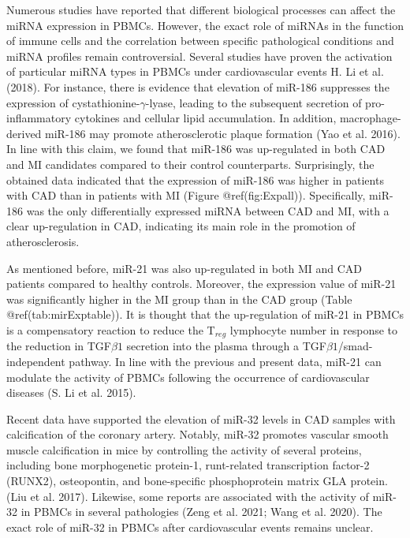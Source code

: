 \documentclass[smallextended]{svjour3}       %
\begin{document}
Numerous studies have reported that different biological processes can
affect the miRNA expression in PBMCs. However, the exact role of miRNAs
in the function of immune cells and the correlation between specific
pathological conditions and miRNA profiles remain controversial. Several
studies have proven the activation of particular miRNA types in PBMCs
under cardiovascular events H. Li et al. (2018). For instance, there is
evidence that elevation of miR-186 suppresses the expression of
cystathionine-\(\gamma\)-lyase, leading to the subsequent secretion of
pro-inflammatory cytokines and cellular lipid accumulation. In addition,
macrophage-derived miR-186 may promote atherosclerotic plaque formation
(Yao et al. 2016). In line with this claim, we found that miR-186 was
up-regulated in both CAD and MI candidates compared to their control
counterparts. Surprisingly, the obtained data indicated that the
expression of miR-186 was higher in patients with CAD than in patients
with MI (Figure @ref(fig:Expall)). Specifically, miR-186 was the only
differentially expressed miRNA between CAD and MI, with a clear
up-regulation in CAD, indicating its main role in the promotion of
atherosclerosis.

As mentioned before, miR-21 was also up-regulated in both MI and CAD
patients compared to healthy controls. Moreover, the expression value of
miR-21 was significantly higher in the MI group than in the CAD group
(Table @ref(tab:mirExptable)). It is thought that the up-regulation of
miR-21 in PBMCs is a compensatory reaction to reduce the T\(_{reg}\)
lymphocyte number in response to the reduction in TGF\(\beta1\)
secretion into the plasma through a TGF\(\beta1\)/smad-independent
pathway. In line with the previous and present data, miR-21 can modulate
the activity of PBMCs following the occurrence of cardiovascular
diseases (S. Li et al. 2015).

Recent data have supported the elevation of miR-32 levels in CAD samples
with calcification of the coronary artery. Notably, miR-32 promotes
vascular smooth muscle calcification in mice by controlling the activity
of several proteins, including bone morphogenetic protein-1,
runt-related transcription factor-2 (RUNX2), osteopontin, and
bone-specific phosphoprotein matrix GLA protein. (Liu et al. 2017).
Likewise, some reports are associated with the activity of miR-32 in
PBMCs in several pathologies (Zeng et al. 2021; Wang et al. 2020). The
exact role of miR-32 in PBMCs after cardiovascular events remains
unclear.
\end{document}
